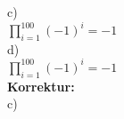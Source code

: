 \documentclass[12pt]{scrartcl}
\begin{document}
c)\\

$\displaystyle{\prod_{i=1}^{100} (-1)^i} = -1$\\

d)\\

$\displaystyle{\prod_{i=1}^{100} (-1)^i} = -1$\\

\textbf{Korrektur:}\\
c)



% 
\end{document}
